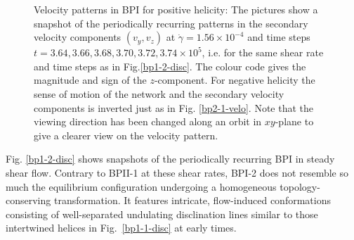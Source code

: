 \documentclass[8.5pt,twoside,twocolumn]{article}
\newcommand{\e}[1]{\times10^{#1}}
\newcommand{\gd}{\dot{\gamma}}
\begin{document}
\begin{figure}[htpb]
\caption{Velocity patterns in BPI for positive helicity: 
The pictures show a snapshot of the periodically recurring patterns in the 
secondary velocity components $(v_y,v_z)$ at $\gd=1.56\e{-4}$ and time steps 
$t=3.64, 3.66,3.68,3.70,3.72,3.74\e{5}$, i.e. for the same shear rate
and time steps as in Fig.\ref{bp1-2-disc}. The colour code gives the magnitude and sign 
of the $z$-component. For negative helicity the sense of motion of the 
network and the secondary velocity components is inverted just as in Fig. \ref{bp2-1-velo}. 
Note that the viewing direction has been changed along an orbit in $xy$-plane
 to give a clearer view on the velocity pattern.
}
\label{bp1-2-velo}
\end{figure}

Fig. \ref{bp1-2-disc} shows snapshots of the periodically recurring 
BPI in steady shear flow. Contrary to BPII-1 at these shear rates, 
BPI-2 does not resemble so much the equilibrium configuration
undergoing a homogeneous topology-conserving 
transformation. 
It features intricate, flow-induced 
conformations consisting of well-separated undulating 
disclination lines similar to those intertwined helices 
in Fig.~\ref{bp1-1-disc} at early times.
\end{document}
